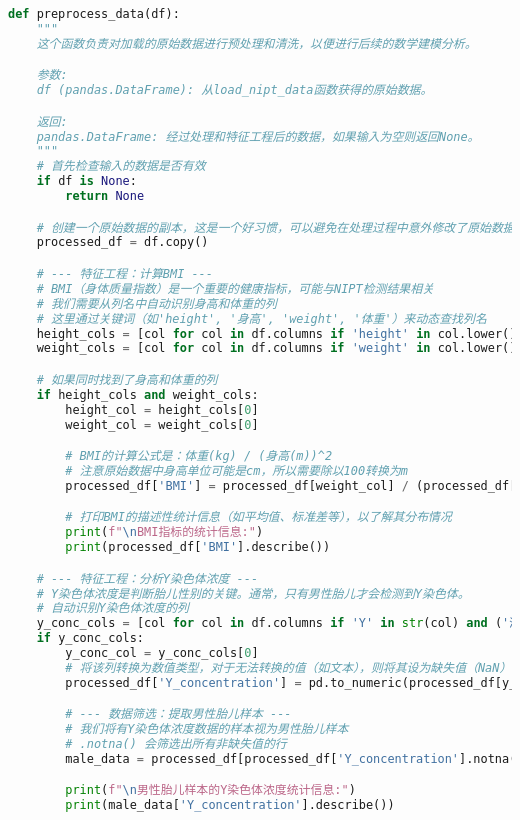 \documentclass[UTF8, a4paper, 11pt]{ctexart}
\begin{document}
\begin{lstlisting}[language=Python, caption={数据加载与预处理脚本。}]
def preprocess_data(df):
    """
    这个函数负责对加载的原始数据进行预处理和清洗，以便进行后续的数学建模分析。

    参数:
    df (pandas.DataFrame): 从load_nipt_data函数获得的原始数据。

    返回:
    pandas.DataFrame: 经过处理和特征工程后的数据，如果输入为空则返回None。
    """
    # 首先检查输入的数据是否有效
    if df is None:
        return None

    # 创建一个原始数据的副本，这是一个好习惯，可以避免在处理过程中意外修改了原始数据
    processed_df = df.copy()

    # --- 特征工程：计算BMI ---
    # BMI（身体质量指数）是一个重要的健康指标，可能与NIPT检测结果相关
    # 我们需要从列名中自动识别身高和体重的列
    # 这里通过关键词（如'height', '身高', 'weight', '体重'）来动态查找列名
    height_cols = [col for col in df.columns if 'height' in col.lower() or '身高' in str(col) or 'D' in str(col)]
    weight_cols = [col for col in df.columns if 'weight' in col.lower() or '体重' in str(col) or 'E' in str(col)]

    # 如果同时找到了身高和体重的列
    if height_cols and weight_cols:
        height_col = height_cols[0]
        weight_col = weight_cols[0]

        # BMI的计算公式是：体重(kg) / (身高(m))^2
        # 注意原始数据中身高单位可能是cm，所以需要除以100转换为m
        processed_df['BMI'] = processed_df[weight_col] / (processed_df[height_col] / 100) ** 2

        # 打印BMI的描述性统计信息（如平均值、标准差等），以了解其分布情况
        print(f"\nBMI指标的统计信息:")
        print(processed_df['BMI'].describe())

    # --- 特征工程：分析Y染色体浓度 ---
    # Y染色体浓度是判断胎儿性别的关键。通常，只有男性胎儿才会检测到Y染色体。
    # 自动识别Y染色体浓度的列
    y_conc_cols = [col for col in df.columns if 'Y' in str(col) and ('浓度' in str(col) or 'conc' in str(col).lower())]
    if y_conc_cols:
        y_conc_col = y_conc_cols[0]
        # 将该列转换为数值类型，对于无法转换的值（如文本），则将其设为缺失值（NaN）
        processed_df['Y_concentration'] = pd.to_numeric(processed_df[y_conc_col], errors='coerce')

        # --- 数据筛选：提取男性胎儿样本 ---
        # 我们将有Y染色体浓度数据的样本视为男性胎儿样本
        # .notna() 会筛选出所有非缺失值的行
        male_data = processed_df[processed_df['Y_concentration'].notna()].copy()

        print(f"\n男性胎儿样本的Y染色体浓度统计信息:")
        print(male_data['Y_concentration'].describe())


\end{lstlisting}
\end{document}
